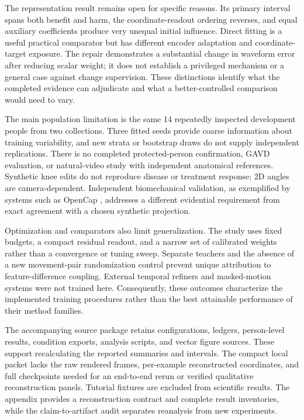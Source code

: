 \documentclass{article}
\begin{document}
The representation result remains open for specific reasons. Its primary interval spans both benefit and harm, the coordinate-readout ordering reverses, and equal auxiliary coefficients produce very unequal initial influence. Direct fitting is a useful practical comparator but has different encoder adaptation and coordinate-target exposure. The repair demonstrates a substantial change in waveform error after reducing scalar weight; it does not establish a privileged mechanism or a general case against change supervision. These distinctions identify what the completed evidence can adjudicate and what a better-controlled comparison would need to vary.

The main population limitation is the same 14 repeatedly inspected development people from two collections. Three fitted seeds provide coarse information about training variability, and new strata or bootstrap draws do not supply independent replications. There is no completed protected-person confirmation, GAVD evaluation, or natural-video study with independent anatomical references. Synthetic knee edits do not reproduce disease or treatment response; 2D angles are camera-dependent. Independent biomechanical validation, as exemplified by systems such as OpenCap \citep{uhlrich2023opencap}, addresses a different evidential requirement from exact agreement with a chosen synthetic projection.

Optimization and comparators also limit generalization. The study uses fixed budgets, a compact residual readout, and a narrow set of calibrated weights rather than a convergence or tuning sweep. Separate teachers and the absence of a new movement-pair randomization control prevent unique attribution to feature-difference coupling. External temporal refiners and masked-motion systems were not trained here. Consequently, these outcomes characterize the implemented training procedures rather than the best attainable performance of their method families.

The accompanying source package retains configurations, ledgers, person-level results, condition exports, analysis scripts, and vector figure sources. These support recalculating the reported summaries and intervals. The compact local packet lacks the raw rendered frames, per-example reconstructed coordinates, and full checkpoints needed for an end-to-end rerun or verified qualitative reconstruction panels. Tutorial fixtures are excluded from scientific results. The appendix provides a reconstruction contract and complete result inventories, while the claim-to-artifact audit separates reanalysis from new experiments.
\end{document}

